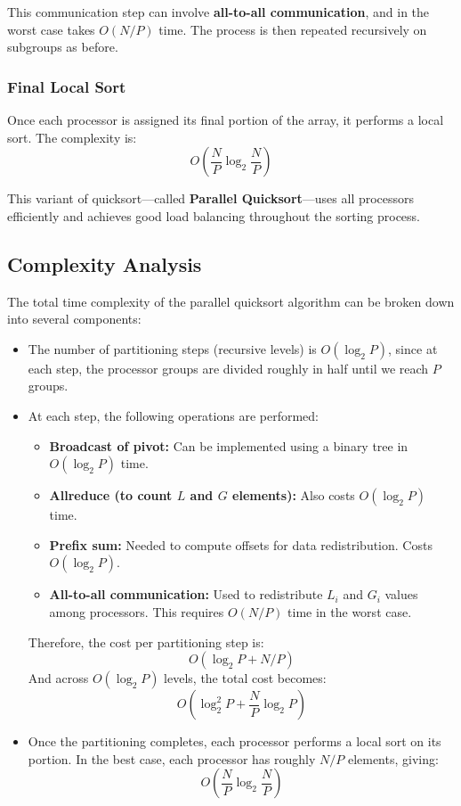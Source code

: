 \documentclass[12pt]{book}
\begin{document}
This communication step can involve \textbf{all-to-all communication}, and in the worst case takes $O(N/P)$ time. The process is then repeated recursively on subgroups as before.

\subsubsection*{Final Local Sort}

Once each processor is assigned its final portion of the array, it performs a local sort. The complexity is:
\[
O\left(\frac{N}{P} \log_2 \frac{N}{P} \right)
\]

This variant of quicksort—called \textbf{Parallel Quicksort}—uses all processors efficiently and achieves good load balancing throughout the sorting process.

\subsection{Complexity Analysis}

The total time complexity of the parallel quicksort algorithm can be broken down into several components:

\begin{itemize}
    \item The number of partitioning steps (recursive levels) is $O(\log_2 P)$, since at each step, the processor groups are divided roughly in half until we reach $P$ groups.
    
    \item At each step, the following operations are performed:
    \begin{itemize}
        \item \textbf{Broadcast of pivot:} Can be implemented using a binary tree in $O(\log_2 P)$ time.
        \item \textbf{Allreduce (to count $L$ and $G$ elements):} Also costs $O(\log_2 P)$ time.
        \item \textbf{Prefix sum:} Needed to compute offsets for data redistribution. Costs $O(\log_2 P)$.
        \item \textbf{All-to-all communication:} Used to redistribute $L_i$ and $G_i$ values among processors. This requires $O(N/P)$ time in the worst case.
    \end{itemize}
    
    Therefore, the cost per partitioning step is:
    \[
    O(\log_2 P + N/P)
    \]
    And across $O(\log_2 P)$ levels, the total cost becomes:
    \[
    O(\log_2^2 P + \frac{N}{P} \log_2 P)
    \]
    
    \item Once the partitioning completes, each processor performs a local sort on its portion. In the best case, each processor has roughly $N/P$ elements, giving:
    \[
    O\left(\frac{N}{P} \log_2 \frac{N}{P}\right)
    \]
\end{itemize}
\end{document}
